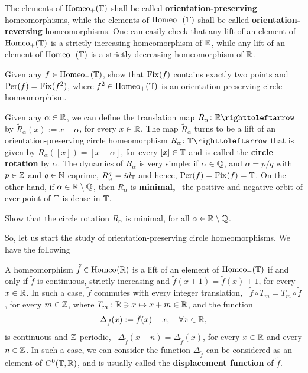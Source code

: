 The elements of $\mathrm{Homeo}_{+}(\mathbb{T})$ shall be called \textbf{orientation-preserving} homeomorphisms, while the elements of $\mathrm{Homeo}_{-}(\mathbb{T})$ shall be called \textbf{orientation-reversing} homeomorphisms. One can easily check that any lift of an element of $\mathrm{Homeo}_{+}(\mathbb{T})$ is a strictly increasing homeomorphism of $\mathbb{R}$, while any lift of an element of $\mathrm{Homeo}_{-}(\mathbb{T})$ is a strictly decreasing homeomorphism of $\mathbb{R}$.

\begin{exercise}
   Given any $f\in\mathrm{Homeo}_{-}(\mathbb{T})$, show that $\operatorname{Fix}(f)$ contains exactly two points and $\operatorname{Per}(f)=\operatorname{Fix}(f^2)$, where $f^2\in\mathrm{Homeo}_{+}(\mathbb{T})$ is an orientation-preserving circle homeomorphism.
\end{exercise}

\begin{example}
  \label{exam:circle-rotations}
  Given any $\alpha\in\mathbb{R}$, we can define the translation map $\tilde{R}_\alpha\colon\R\carr$ by $\tilde{R}_\alpha(x):=x+\alpha$, for every $x\in\mathbb{R}$. The map $\tilde{R}_\alpha$ turns to be a lift of an orientation-preserving circle homeomorphism $R_\alpha\colon\T\carr$ that is given by $R_\alpha([x])=[x+\alpha]$, for every $[x]\in\mathbb{T}$ and is called the \textbf{circle rotation} by $\alpha$. The dynamics of $R_\alpha$ is very simple: if $\alpha\in\mathbb{Q}$, and $\alpha=p/q$ with $p\in\mathbb{Z}$ and $q\in\mathbb{N}$ coprime, $R_\alpha^q=id_{\mathbb{T}}$ and hence, $\operatorname{Per}(f)=\operatorname{Fix}(f)=\mathbb{T}$. On the other hand, if $\alpha\in\mathbb{R}\setminus\mathbb{Q}$, then $R_\alpha$ is \textbf{minimal,} \ie~the positive and negative orbit of ever point of $\mathbb{T}$ is dense in $\mathbb{T}$.
\end{example}

\begin{exercise}
  Show that the circle rotation $R_\alpha$ is minimal, for all $\alpha\in\mathbb{R}\setminus\mathbb{Q}$.
\end{exercise}


So, let us start the study of orientation-preserving circle homeomorphisms. We have the following

\begin{exercise}
  A homeomorphism $\tilde f\in\mathrm{Homeo}_{}(\mathbb{R})$ is a lift of an element of $\mathrm{Homeo}_{+}(\mathbb{T})$ if and only if $\tilde f$ is continuous, strictly increasing and $\tilde f(x+1)=\tilde f(x)+1$, for every $x\in\mathbb{R}$. In such a case, $\tilde f$ commutes with every integer translation, \ie~$\tilde f\circ T_m=T_m\circ\tilde f$, for every $m\in\mathbb{Z}$, where $T_m:\mathbb{R}\ni x\mapsto x+m\in\mathbb{R}$, and the function
  \begin{displaymath}
    \Delta_{\tilde f}(x):=\tilde f(x)-x, \quad\forall x\in\mathbb{R},
  \end{displaymath}
  is continuous and $\mathbb{Z}$-periodic, \ie~$\Delta_{\tilde f}(x+n)=\Delta_{\tilde f}(x)$, for every $x\in\mathbb{R}$ and every $n\in\mathbb{Z}$. In such a case, we can consider the function $\Delta_{\tilde f}$ can be considered as an element of $C^0(\mathbb{T},\mathbb{R})$, and is usually called the \textbf{displacement function} of $\tilde f$.
\end{exercise}

